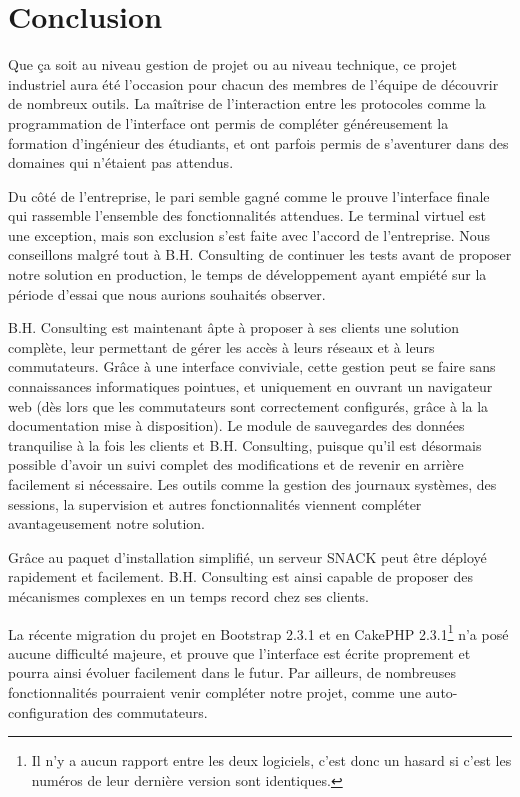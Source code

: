 \section{Conclusion}

Que ça soit au niveau gestion de projet ou au niveau technique, ce projet industriel aura été l'occasion pour chacun des membres de l'équipe de découvrir de nombreux outils. La maîtrise de l'interaction entre les protocoles comme la programmation de l'interface ont permis de compléter généreusement la formation d'ingénieur des étudiants, et ont parfois permis de s'aventurer dans des domaines qui n'étaient pas attendus.

Du côté de l'entreprise, le pari semble gagné comme le prouve l'interface finale qui rassemble l'ensemble des fonctionnalités attendues. Le terminal virtuel est une exception, mais son exclusion s'est faite avec l'accord de l'entreprise. Nous conseillons malgré tout à B.H. Consulting de continuer les tests avant de proposer notre solution en production, le temps de développement ayant empiété sur la période d'essai que nous aurions souhaités observer.

B.H. Consulting est maintenant âpte à proposer à ses clients une solution complète, leur permettant de gérer les accès à leurs réseaux et à leurs commutateurs. Grâce à une interface conviviale, cette gestion peut se faire sans connaissances informatiques pointues, et uniquement en ouvrant un navigateur web (dès lors que les commutateurs sont correctement configurés, grâce à la la documentation mise à disposition). Le module de sauvegardes des données tranquilise à la fois les clients et B.H. Consulting, puisque qu'il est désormais possible d'avoir un suivi complet des modifications et de revenir en arrière facilement si nécessaire. Les outils comme la gestion des journaux systèmes, des sessions, la supervision et autres fonctionnalités viennent compléter avantageusement notre solution.

Grâce au paquet d'installation simplifié, un serveur SNACK peut être déployé rapidement et facilement. B.H. Consulting est ainsi capable de proposer des mécanismes complexes en un temps record chez ses clients.

La récente migration du projet en Bootstrap 2.3.1 et en CakePHP 2.3.1\footnote{Il n'y a aucun rapport entre les deux logiciels, c'est donc un hasard si c'est les numéros de leur dernière version sont identiques.} n'a posé aucune difficulté majeure, et prouve que l'interface est écrite proprement et pourra ainsi évoluer facilement dans le futur. Par ailleurs, de nombreuses fonctionnalités pourraient venir compléter notre projet, comme une auto-configuration des commutateurs.

